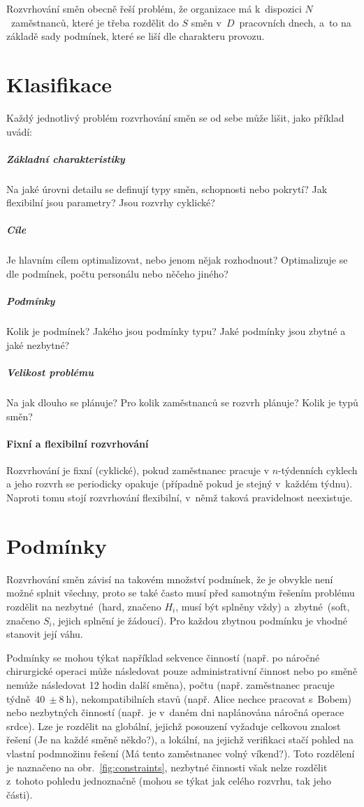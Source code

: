 \documentclass[twoside]{ctuthesis}
\begin{document}
Rozvrhování směn obecně řeší problém, že organizace má k~dispozici $N$~zaměstnanců, které je třeba rozdělit do $S$ směn v~$D$~pracovních dnech, a~to na základě sady podmínek, které se liší dle charakteru provozu.

\section{Klasifikace}
\label{sec:clasif}

Každý jednotlivý problém rozvrhování směn se od sebe může lišit, \cite{de2011categorisation} jako příklad uvádí:

\subparagraph{Základní charakteristiky}
Na jaké úrovni detailu se definují typy směn, schopnosti nebo pokrytí? Jak flexibilní jsou parametry? Jsou rozvrhy cyklické?

\subparagraph{Cíle}
Je hlavním cílem optimalizovat, nebo jenom nějak rozhodnout? Optimalizuje se dle podmínek, počtu personálu nebo něčeho jiného?

\subparagraph{Podmínky}
Kolik je podmínek? Jakého jsou podmínky typu? Jaké podmínky jsou zbytné a jaké nezbytné?

\subparagraph{Velikost problému}
Na jak dlouho se plánuje? Pro kolik zaměstnanců se rozvrh plánuje? Kolik je typů směn?

\paragraph{Fixní a flexibilní rozvrhování}
Rozvrhování je fixní (cyklické), pokud zaměstnanec pracuje v $n$-týdenních cyklech a jeho rozvrh se periodicky opakuje (případně pokud je stejný v~každém týdnu). Naproti tomu stojí rozvrhování flexibilní, v~němž taková pravidelnost neexistuje. \cite{burke2004state}


\section{Podmínky}
\label{sec:constraints}
Rozvrhování směn závisí na takovém množství podmínek, že je obvykle není možné splnit všechny, proto se také často musí před samotným řešením problému rozdělit na nezbytné~(hard, značeno $H_i$, musí být splněny vždy) a~zbytné~(soft, značeno $S_i$, jejich splnění je žádoucí). \cite{todorovic2012bee} Pro každou zbytnou podmínku je vhodné stanovit její váhu. \cite{buyukozkan2014applicability}

Podmínky se mohou týkat například sekvence činností (např. po náročné chirurgické operaci může následovat pouze administrativní činnost nebo po směně nemůže následovat 12 hodin další směna), počtu (např. zaměstnanec pracuje týdně~$ 40~\pm 8~\mbox{h}$), nekompatibilních stavů (např. Alice nechce pracovat s~Bobem) nebo nezbytných činností (např.~je v~daném dni naplánována náročná operace srdce). Lze je rozdělit na globální, jejichž posouzení vyžaduje celkovou znalost řešení (Je na každé směně někdo?), a lokální, na jejichž verifikaci stačí pohled na vlastní podmnožinu řešení (Má tento zaměstnanec volný víkend?). Toto rozdělení je naznačeno na obr.~\ref{fig:constraints}, nezbytné činnosti však nelze rozdělit z~tohoto pohledu jednoznačně (mohou se týkat jak celého rozvrhu, tak jeho části). \cite{blochliger2004modeling}
\end{document}
